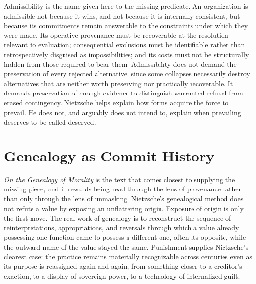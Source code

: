 \documentclass[11pt]{article}
\begin{document}
Admissibility is the name given here to the missing predicate. An organization is admissible not because it wins, and not because it is internally consistent, but because its commitments remain answerable to the constraints under which they were made. Its operative provenance must be recoverable at the resolution relevant to evaluation; consequential exclusions must be identifiable rather than retrospectively disguised as impossibilities; and its costs must not be structurally hidden from those required to bear them. Admissibility does not demand the preservation of every rejected alternative, since some collapses necessarily destroy alternatives that are neither worth preserving nor practically recoverable. It demands preservation of enough evidence to distinguish warranted refusal from erased contingency. Nietzsche helps explain how forms acquire the force to prevail. He does not, and arguably does not intend to, explain when prevailing deserves to be called deserved.

\section*{Genealogy as Commit History}

\emph{On the Genealogy of Morality} is the text that comes closest to supplying the missing piece, and it rewards being read through the lens of provenance rather than only through the lens of unmasking. Nietzsche's genealogical method does not refute a value by exposing an unflattering origin. Exposure of origin is only the first move. The real work of genealogy is to reconstruct the sequence of reinterpretations, appropriations, and reversals through which a value already possessing one function came to possess a different one, often its opposite, while the outward name of the value stayed the same. Punishment supplies Nietzsche's clearest case: the practice remains materially recognizable across centuries even as its purpose is reassigned again and again, from something closer to a creditor's exaction, to a display of sovereign power, to a technology of internalized guilt.
\end{document}
